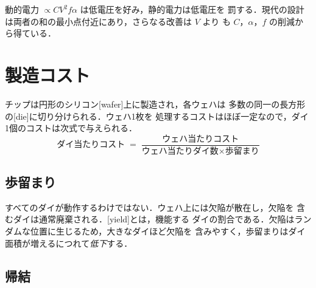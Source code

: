 \documentclass[../main.tex]{subfiles}
\begin{document}
\begin{marginfigure}
  \resizebox{\linewidth}{!}{}
  \caption{電源電圧を変えると，動的電力と静的電力は逆方向に動く．}
  \label{fig:power}
\end{marginfigure}

\begin{keypoint}[電力]
  動的電力 $\propto C V^{2} f \alpha$ は低電圧を好み，静的電力は低電圧を
  罰する．現代の設計は両者の和の最小点付近にあり，さらなる改善は $V$ より
  も $C$，$\alpha$，$f$ の削減から得ている．
\end{keypoint}

\section{製造コスト}

チップは円形のシリコン[wafer]上に製造され，各ウェハは
多数の同一の長方形の[die]に切り分けられる．ウェハ1枚を
処理するコストはほぼ一定なので，ダイ1個のコストは次式で与えられる．
\begin{equation}
  \text{ダイ当たりコスト} \;=\;
  \frac{\text{ウェハ当たりコスト}}
       {\text{ウェハ当たりダイ数} \times \text{歩留まり}}
  \label{eq:die-cost}
\end{equation}

\subsection{歩留まり}

すべてのダイが動作するわけではない．ウェハ上には欠陥が散在し，欠陥を
含むダイは通常廃棄される．[yield]とは，機能する
ダイの割合である．欠陥はランダムな位置に生じるため，大きなダイほど欠陥を
含みやすく，歩留まりはダイ面積が増えるにつれて\emph{低下}する．

\subsection{帰結}
\end{document}

